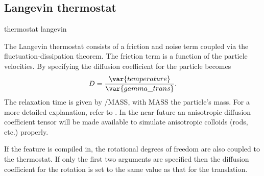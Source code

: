 \subsection{Langevin thermostat}

\begin{pysyntax}
\end{pysyntax}

\begin{essyntax}
  thermostat langevin   \\
    
\end{essyntax}


The Langevin thermostat consists of a friction and noise term coupled
via the fluctuation-dissipation theorem. The friction term is a
function of the particle velocities. By specifying  the diffusion coefficient for the particle becomes
\begin{equation}
D = \frac{\var{temperature}}{\var{gamma\_trans}}.
\end{equation}
The relaxation time is given by /MASS, with MASS the particle's mass. For a more detailed explanation,
refer to \cite{grest86a}. In the near future an anisotropic diffusion coefficient tensor will be made available to simulate anisotropic colloids (rods, etc.) properly.

If the feature  is compiled in, the rotational
degrees of freedom are also coupled to the thermostat. If only the first two arguments are specified then the diffusion coefficient for the rotation is set to the same value as that for the translation.


